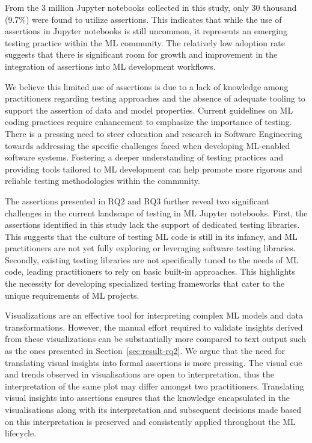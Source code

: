 
From the 3 million Jupyter notebooks collected in this study, only 30 thousand (9.7\%) were found to utilize assertions. This indicates that while the use of assertions in Jupyter notebooks is still uncommon, it represents an emerging testing practice within the ML community. The relatively low adoption rate suggests that there is significant room for growth and improvement in the integration of assertions into ML development workflows.

We believe this limited use of assertions is due to a lack of knowledge among practitioners regarding testing approaches and the absence of adequate tooling to support the assertion of data and model properties. Current guidelines on ML coding practices require enhancement to emphasize the importance of testing. There is a pressing need to steer education and research in Software Engineering towards addressing the specific challenges faced when developing ML-enabled software systems. Fostering a deeper understanding of testing practices and providing tools tailored to ML development can help promote more rigorous and reliable testing methodologies within the community.

The assertions presented in RQ2 and RQ3 further reveal two significant challenges in the current landscape of testing in ML Jupyter notebooks. First, the assertions identified in this study lack the support of dedicated testing libraries. This suggests that the culture of testing ML code is still in its infancy, and ML practitioners are not yet fully exploring or leveraging software testing libraries. Secondly, existing testing libraries are not specifically tuned to the needs of ML code, leading practitioners to rely on basic built-in approaches. This highlights the necessity for developing specialized testing frameworks that cater to the unique requirements of ML projects.

Visualizations are an effective tool for interpreting complex ML models and data transformations. However, the manual effort required to validate insights derived from these visualizations can be substantially more compared to text output such as the ones presented in Section~\ref{sec:result-rq2}. We argue that the need for translating visual insights into formal assertions is more pressing. The visual cue and trends observed in visualisations are open to interpretation, thus the interpretation of the same plot may differ amongst two practitioners. Translating visual insights into assertions ensures that the knowledge encapsulated in the visualisations along with its interpretation and subsequent decisions made based on this interpretation is preserved and consistently applied throughout the ML lifecycle.

